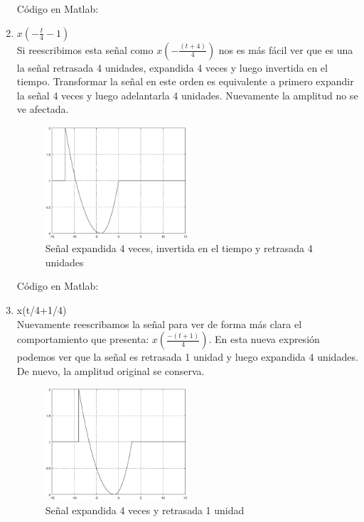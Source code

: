 \documentclass[10pt,a4paper]{report}
\begin{document}
\begin{enumerate}
Código en Matlab:
    
    
  \item $x\left(-\frac{t}{4}-1\right)$\\
  \newline Si reescribimos esta señal como $x\left(-\frac{\left(t+4\right)}{4}\right)$ nos es más fácil ver que es una la señal retrasada 4 unidades, expandida 4 veces y luego invertida en el tiempo. Transformar la señal en este orden es equivalente a primero expandir la señal 4 veces y luego adelantarla 4 unidades. Nuevamente la amplitud no se ve afectada.

    \begin{figure}[H]
      \begin{center}
        \includegraphics[width=0.5\textwidth]{Ejercicio2/IncisoC}
        \caption{Señal expandida 4 veces, invertida en el tiempo y retrasada 4 unidades}
        \label{fig:IncisoC}
      \end{center}
    \end{figure}
    
Código en Matlab:
    
    \newpage

  \item x(t/4+1/4)\\
  \newline Nuevamente reescribamos la señal para ver de forma más clara el comportamiento que presenta: $x\left(\frac{-\left(t+1\right)}{4}\right)$. En esta nueva expresión podemos ver que la señal es retrasada 1 unidad y luego expandida 4 unidades. De nuevo, la amplitud original se conserva.
    \begin{figure}[H]
      \begin{center}
        \includegraphics[width=0.5\textwidth]{Ejercicio2/IncisoD}
        \caption{Señal expandida 4 veces y retrasada 1 unidad}
        \label{fig:IncisoD}
      \end{center}
    \end{figure}
    

\end{enumerate}
\end{document}

